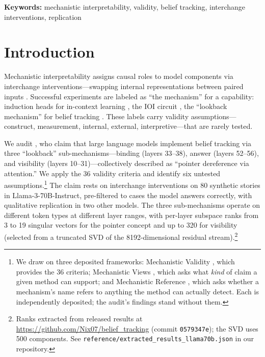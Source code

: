 \documentclass{article}
\begin{document}
\begin{abstract}
\end{abstract}

\noindent\textbf{Keywords:} mechanistic interpretability, validity, belief tracking, interchange interventions, replication


\section{Introduction}
\label{sec:intro}

Mechanistic interpretability assigns causal roles to model components via interchange interventions---swapping internal representations between paired inputs \citep{geiger2021causal, vig2020investigating}. Successful experiments are labeled as ``the mechanism'' for a capability: induction heads for in-context learning \citep{olsson2022context}, the IOI circuit \citep{wang2023interpretability}, the ``lookback mechanism'' for belief tracking \citep{prakash2025lookback}. These labels carry validity assumptions---construct, measurement, internal, external, interpretive---that are rarely tested.

We audit \citet{prakash2025lookback}, who claim that large language models implement belief tracking via three ``lookback'' sub-mechanisms---binding (layers 33--38), answer (layers 52--56), and visibility (layers 10--31)---collectively described as ``pointer dereference via attention.'' We apply the 36 validity criteria and identify six untested assumptions.\footnote{We draw on three deposited frameworks: Mechanistic Validity \citep{tower2026mechval}, which provides the 36 criteria; Mechanistic Views \citep{tower2026mechviews}, which asks what \emph{kind} of claim a given method can support; and Mechanistic Reference \citep{tower2026mechref}, which asks whether a mechanism's name refers to anything the method can actually detect. Each is independently deposited; the audit's findings stand without them.} The claim rests on interchange interventions on 80 synthetic stories in Llama-3-70B-Instruct, pre-filtered to cases the model answers correctly, with qualitative replication in two other models. The three sub-mechanisms operate on different token types at different layer ranges, with per-layer subspace ranks from 3 to 19 singular vectors for the pointer concept and up to 320 for visibility (selected from a truncated SVD of the 8192-dimensional residual stream).\footnote{Ranks extracted from released results at \url{https://github.com/Nix07/belief_tracking} (commit \texttt{0579347e}); the SVD uses 500 components. See \texttt{reference/extracted\_results\_llama70b.json} in our repository.}
\end{document}
